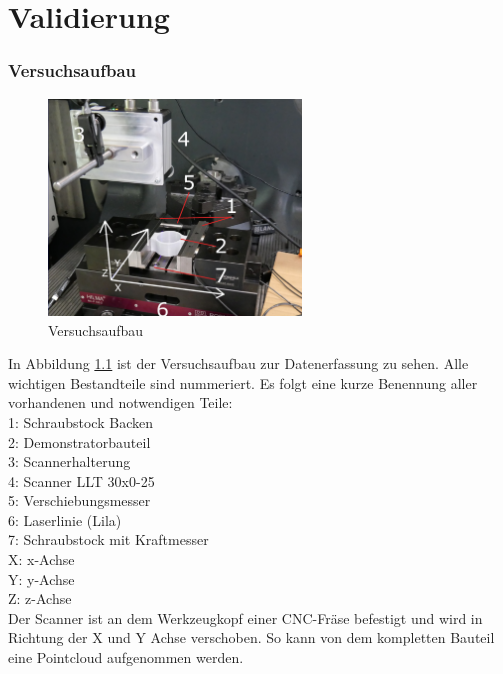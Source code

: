 
\chapter{Validierung}

\subsection{Versuchsaufbau}

\begin{figure}
    \includegraphics[width=0.6\textwidth]{images/versuchsaufbau_foto.png.JPG}
    \caption{Versuchsaufbau}
    \label{fig:versuchsaufbau}
\end{figure}

In Abbildung \ref{fig:versuchsaufbau} ist der Versuchsaufbau zur Datenerfassung 
zu sehen. Alle wichtigen Bestandteile sind nummeriert. Es folgt eine kurze Benennung
aller vorhandenen und notwendigen Teile:\\
1: Schraubstock Backen\\
2: Demonstratorbauteil\\
3: Scannerhalterung\\
4: Scanner LLT 30x0-25\\
5: Verschiebungsmesser\\
6: Laserlinie (Lila)\\
7: Schraubstock mit Kraftmesser\\
X: x-Achse\\
Y: y-Achse\\
Z: z-Achse\\

Der Scanner ist an dem Werkzeugkopf einer CNC-Fräse befestigt und wird 
in Richtung der X und Y Achse verschoben. So kann von dem kompletten Bauteil eine 
Pointcloud aufgenommen werden.
